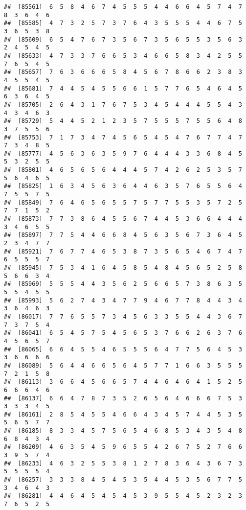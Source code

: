 \documentclass[
]{book}
\begin{document}
\begin{verbatim}
##  [85561]  6  5  8  4  6  7  4  5  5  5  4  4  6  6  4  5  7  4  7  8  3  6  4  6
##  [85585]  4  7  3  2  5  7  3  7  6  4  3  5  5  5  4  4  6  7  5  3  6  5  3  8
##  [85609]  6  5  4  7  6  7  3  5  6  7  3  5  6  5  5  3  5  6  3  2  4  5  4  5
##  [85633]  4  7  3  3  7  6  6  5  3  4  6  6  5  8  3  4  2  5  5  7  6  5  4  5
##  [85657]  7  6  3  6  6  6  5  8  4  5  6  7  8  6  6  2  3  8  3  4  5  5  4  5
##  [85681]  7  4  4  5  4  5  5  6  6  1  5  7  7  6  5  4  6  4  5  6  3  6  4  5
##  [85705]  2  6  4  3  1  7  6  7  5  3  4  5  4  4  4  5  5  4  3  4  3  4  6  3
##  [85729]  5  4  4  5  2  1  2  3  5  7  5  5  5  7  5  5  6  4  8  3  7  5  5  6
##  [85753]  7  1  7  3  4  7  4  5  6  5  4  5  4  7  6  7  7  4  7  7  3  4  8  5
##  [85777]  4  5  6  3  6  3  5  9  7  6  4  4  4  3  3  6  8  4  5  5  3  2  5  5
##  [85801]  4  6  5  6  5  6  4  4  4  5  7  4  2  6  2  5  3  5  7  5  6  4  6  5
##  [85825]  1  6  3  4  5  6  3  6  4  4  6  3  5  7  6  5  5  6  4  7  5  5  7  5
##  [85849]  7  6  4  6  5  6  5  5  7  5  7  7  5  5  3  5  7  2  5  7  7  1  5  2
##  [85873]  7  7  3  8  6  4  5  5  6  7  4  4  5  3  6  6  4  4  4  3  4  6  5  5
##  [85897]  7  7  5  4  4  6  6  8  4  5  6  3  5  6  7  3  6  4  5  2  3  4  7  7
##  [85921]  7  6  7  7  4  6  5  3  8  7  3  5  6  5  4  6  7  4  7  6  5  5  5  7
##  [85945]  7  5  3  4  1  6  4  5  8  5  4  8  4  5  6  5  2  5  8  5  6  6  3  4
##  [85969]  5  5  5  4  4  3  5  6  2  5  6  6  5  7  3  8  6  3  5  5  5  4  5  5
##  [85993]  5  6  2  7  4  3  4  7  7  9  4  6  7  7  8  4  4  3  4  3  6  4  6  3
##  [86017]  7  7  6  5  5  7  3  4  5  6  3  3  5  5  4  4  3  6  7  7  3  7  5  4
##  [86041]  6  5  4  5  7  5  4  5  6  5  3  7  6  6  2  6  3  7  6  4  5  6  5  7
##  [86065]  6  6  4  5  5  4  6  5  5  5  6  4  7  7  5  6  4  5  3  3  6  6  6  6
##  [86089]  5  6  4  4  6  6  5  6  4  5  7  7  1  6  6  3  5  5  5  7  2  1  5  8
##  [86113]  3  6  6  4  5  6  6  5  7  4  4  6  4  6  4  1  5  2  5  6  6  6  4  6
##  [86137]  6  6  4  7  8  7  3  5  2  6  5  6  4  6  6  6  7  5  3  3  3  3  4  5
##  [86161]  2  8  5  4  5  5  4  6  6  4  3  4  5  7  4  4  5  3  5  5  6  5  7  7
##  [86185]  8  3  3  4  5  7  5  6  5  4  6  8  5  3  4  3  5  4  8  6  8  4  3  4
##  [86209]  4  6  3  5  4  5  9  6  5  5  4  2  6  7  5  2  7  6  6  3  9  5  7  4
##  [86233]  4  6  3  2  5  5  3  8  1  2  7  8  3  6  4  3  6  7  3  5  5  5  5  4
##  [86257]  3  3  3  8  4  5  4  5  3  5  4  4  5  3  5  6  7  7  5  3  4  6  4  3
##  [86281]  4  4  6  4  5  4  5  4  5  3  9  5  5  4  5  2  3  2  3  7  6  5  2  5

\end{verbatim}
\end{document}
